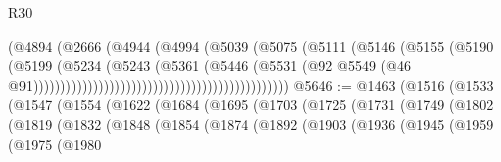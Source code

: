 \begin{lexlean}{R30}
\begin{coremodule}
                                                              (@4894
                                                                (@2666
                                                                  (@4944
                                                                    (@4994
                                                                      (@5039
                                                                        (@5075
                                                                          (@5111
                                                                            (@5146
                                                                              (@5155
                                                                                (@5190
                                                                                  (@5199
                                                                                    (@5234
                                                                                      (@5243
                                                                                        (@5361
                                                                                          (@5446
                                                                                            (@5531
                                                                                              (@92
                                                                                                @5549
                                                                                                (@46
                                                                                                  @91)))))))))))))))))))))))))))))))))))))))))))))))
@5646 := @1463
    (@1516
      (@1533
        (@1547
          (@1554
            (@1622
              (@1684
                (@1695
                  (@1703
                    (@1725
                      (@1731
                        (@1749
                          (@1802
                            (@1819
                              (@1832
                                (@1848
                                  (@1854
                                    (@1874
                                      (@1892
                                        (@1903
                                          (@1936
                                            (@1945
                                              (@1959
                                                (@1975
                                                  (@1980

\end{coremodule}
\end{lexlean}
